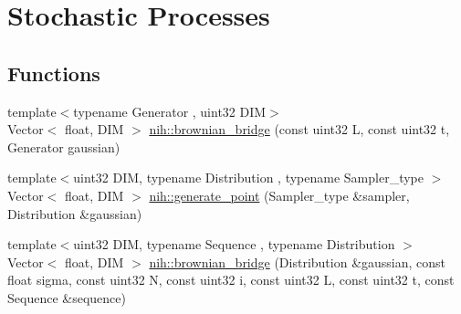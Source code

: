 \hypertarget{group__processes}{
\section{\-Stochastic \-Processes}
\label{group__processes}
}
\subsection*{\-Functions}
\begin{DoxyCompactItemize}
\item 
{\footnotesize template$<$typename Generator , uint32 \-D\-I\-M$>$ }\\\-Vector$<$ float, \-D\-I\-M $>$ \hyperlink{group__processes_gabb2dd2ed5d619ca9c891ed4ce050fa6a}{nih\-::brownian\-\_\-bridge} (const uint32 \-L, const uint32 t, \-Generator gaussian)
\item 
{\footnotesize template$<$uint32 \-D\-I\-M, typename Distribution , typename Sampler\-\_\-type $>$ }\\\-Vector$<$ float, \-D\-I\-M $>$ \hyperlink{group__processes_ga1e80545c2d9cb0ccdc535bd7bbc6b003}{nih\-::generate\-\_\-point} (\-Sampler\-\_\-type \&sampler, \-Distribution \&gaussian)
\item 
{\footnotesize template$<$uint32 \-D\-I\-M, typename Sequence , typename Distribution $>$ }\\\-Vector$<$ float, \-D\-I\-M $>$ \hyperlink{group__processes_gadd2480f0c83af4a386b888ed7ed8e955}{nih\-::brownian\-\_\-bridge} (\-Distribution \&gaussian, const float sigma, const uint32 \-N, const uint32 i, const uint32 \-L, const uint32 t, const \-Sequence \&sequence)
\end{DoxyCompactItemize}


